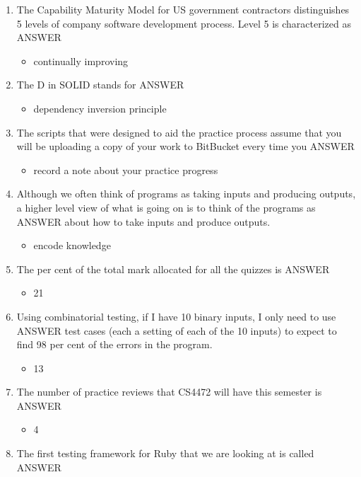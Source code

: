 \documentclass{exam}
\begin{document}
\begin{enumerate}
\item The Capability Maturity Model for US government contractors distinguishes 5 levels of company software development process.  Level 5 is characterized as ANSWER
\begin{itemize}
\item continually improving
\end{itemize}
\item The D in SOLID stands for ANSWER
\begin{itemize}
\item dependency inversion principle
\end{itemize}
\item The scripts that were designed to aid the practice process assume that you will be uploading a copy of your work to BitBucket every time you ANSWER
\begin{itemize}
\item record a note about your practice progress
\end{itemize}
\item Although we often think of programs as taking inputs and producing outputs, a higher level view of what is going on is to think of the programs as ANSWER about how to take inputs and produce outputs.
\begin{itemize}
\item encode knowledge
\end{itemize}
\item The per cent of the total mark allocated for all the quizzes is ANSWER
\begin{itemize}
\item 21
\end{itemize}
\item Using combinatorial testing, if I have 10 binary inputs, I only need to use ANSWER test cases (each a setting of each of the 10 inputs) to expect to find 98 per cent of the errors in the program.
\begin{itemize}
\item 13
\end{itemize}
\item The number of practice reviews that CS4472 will have this semester is ANSWER
\begin{itemize}
\item 4
\end{itemize}
\item The first testing framework for Ruby that we are looking at is called ANSWER

\end{enumerate}
\end{document}
